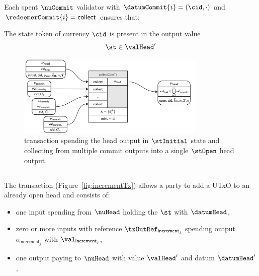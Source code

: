 \noindent Each spent $\nuCommit$ validator with $\datumCommit{i} = (\cid,\cdot)$ and $\redeemerCommit{i} = \mathsf{collect}$ ensures that:
\begin{menumerate}
	\item The state token of currency $\cid$ is present in the output value
	\[
		\st \in \valHead'
	\]
\end{menumerate}

\begin{figure}
	\centering
        \includegraphics[width=0.8\textwidth]{Hydra/Protocol/Figures/collectComTx.pdf}
	\caption{\mtxCCom{} transaction spending the head output in $\stInitial$
		state and collecting from multiple commit outputs into a single
		$\stOpen$ head output.}\label{fig:collectComTx}
\end{figure}

\subsection{}\label{sec:increment-tx}

\noindent The \mtxIncrement{} transaction (Figure~\ref{fig:incrementTx}) allows a party to
add a UTxO to an already open head and consists of:

\begin{itemize}
	\item one input spending from $\nuHead$ holding the $\st$ with $\datumHead$,
	\item zero or more inputs with reference $\txOutRef_{\mathsf{increment}_{j}}$
	      spending output $o_{\mathsf{increment}_{j}}$ with
	      $\val_{\mathsf{increment}_{j}}$,
	\item one output paying to $\nuHead$ with value $\valHead'$ and
		  datum $\datumHead'$,
\end{itemize}

